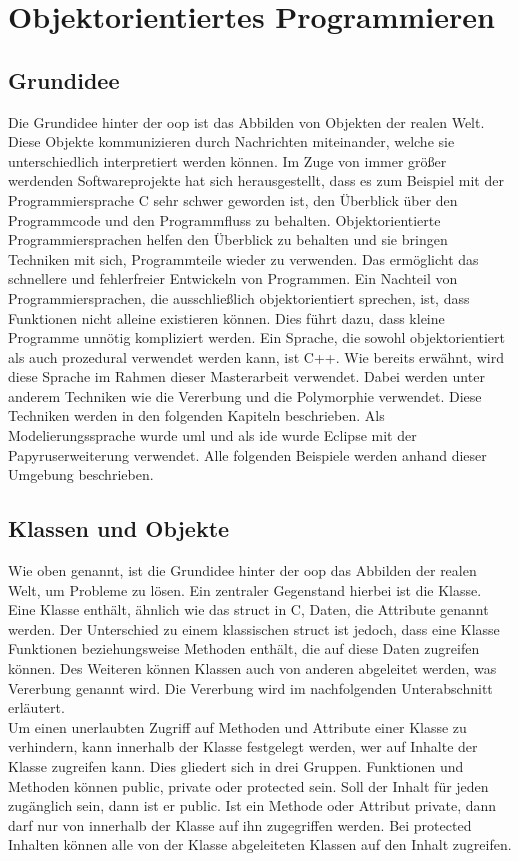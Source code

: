 \section{Objektorientiertes Programmieren }

\subsection{Grundidee }
Die Grundidee hinter der \acf{oop} ist das Abbilden von Objekten der realen Welt. Diese Objekte kommunizieren durch Nachrichten miteinander, welche sie  unterschiedlich interpretiert werden können.  Im Zuge von immer größer werdenden Softwareprojekte hat sich herausgestellt, dass es zum Beispiel mit der Programmiersprache C sehr schwer geworden ist, den  Überblick über den Programmcode und den Programmfluss zu behalten. Objektorientierte Programmiersprachen helfen den Überblick zu behalten und sie bringen Techniken mit sich, Programmteile wieder zu verwenden. Das ermöglicht  das schnellere und fehlerfreier Entwickeln von Programmen. Ein Nachteil von Programmiersprachen, die ausschließlich objektorientiert sprechen, ist, dass Funktionen nicht alleine existieren können. Dies führt dazu, dass kleine Programme unnötig kompliziert werden. Ein Sprache, die sowohl objektorientiert als auch prozedural verwendet werden kann, ist C++. Wie bereits erwähnt, wird diese Sprache im Rahmen dieser Masterarbeit verwendet.    
Dabei werden unter anderem  Techniken wie die Vererbung und die Polymorphie verwendet. Diese Techniken werden in den folgenden Kapiteln beschrieben. Als Modelierungssprache wurde \ac{uml} und als \ac{ide} wurde Eclipse mit der Papyruserweiterung verwendet. Alle folgenden Beispiele werden anhand dieser Umgebung beschrieben. \\
\cite{HelmutErlenkotter.}
\cite{Prof.Dr.AlfredIrber.}

\subsection{Klassen und Objekte}
Wie oben genannt, ist die Grundidee hinter der \ac{oop} das Abbilden der realen Welt, um Probleme zu lösen. Ein zentraler Gegenstand hierbei ist die Klasse. Eine Klasse enthält, ähnlich wie das \glqq struct\grqq{} in C, Daten, die Attribute genannt werden. Der Unterschied zu einem klassischen  \glqq struct\grqq{} ist jedoch, dass eine Klasse Funktionen beziehungsweise Methoden enthält, die auf diese Daten zugreifen können. Des Weiteren können  Klassen auch von anderen abgeleitet werden, was Vererbung genannt wird. Die Vererbung wird im nachfolgenden Unterabschnitt erläutert. \\
Um einen unerlaubten Zugriff auf Methoden und Attribute einer Klasse zu verhindern, kann innerhalb der Klasse festgelegt werden, wer auf Inhalte der Klasse zugreifen kann. Dies gliedert sich in drei Gruppen. Funktionen und Methoden können \glqq public\grqq{},  \glqq private\grqq{} oder \glqq protected\grqq{} sein. Soll der Inhalt für jeden zugänglich sein, dann ist er \glqq public\grqq{}. Ist ein Methode oder Attribut \glqq private\grqq{}, dann darf nur von innerhalb der Klasse auf ihn zugegriffen werden. Bei \glqq protected\grqq{} Inhalten können alle von der Klasse abgeleiteten Klassen auf den Inhalt zugreifen.

